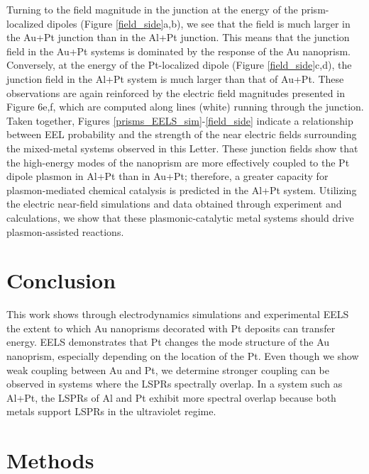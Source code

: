 \documentclass [11pt, proquest] {uwthesis}[2016/11/22]
\begin{document}
Turning to the field magnitude in the junction at the energy of the prism-localized dipoles (Figure \ref{field_side}a,b), we see that the field is much larger in the Au+Pt junction than in the Al+Pt junction. This means that the junction field in the Au+Pt systems is dominated by the response of the Au nanoprism. Conversely, at the energy of the Pt-localized dipole (Figure \ref{field_side}c,d), the junction field in the Al+Pt system is much larger than that of Au+Pt. These observations are again reinforced by the electric field magnitudes presented in Figure 6e,f, which are computed along lines (white) running through the junction. Taken together, Figures \ref{prisms_EELS_sim}-\ref{field_side} indicate a relationship between EEL probability and the strength of the near electric fields surrounding the mixed-metal systems observed in this Letter. These junction fields show that the high-energy modes of the nanoprism are more effectively coupled to the Pt dipole plasmon in Al+Pt than in Au+Pt; therefore, a greater capacity for plasmon-mediated chemical catalysis is predicted in the Al+Pt system. Utilizing the electric near-field simulations and data obtained through experiment and calculations, we show that these plasmonic-catalytic metal systems should drive plasmon-assisted reactions.

\section{Conclusion}
This work shows through electrodynamics simulations and experimental EELS the extent to which Au nanoprisms decorated with Pt deposits can transfer energy. EELS demonstrates that Pt changes the mode structure of the Au nanoprism, especially depending on the location of the Pt. Even though we show weak coupling between Au and Pt, we determine stronger coupling can be observed in systems where the LSPRs spectrally overlap. In a system such as Al+Pt, the LSPRs of Al and Pt exhibit more spectral overlap because both metals support LSPRs in the ultraviolet regime.

\section{Methods}
\end{document}
